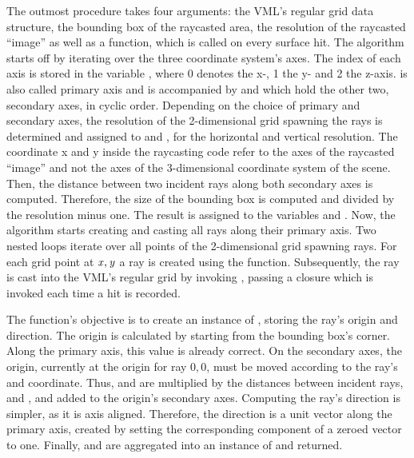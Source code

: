 %
The outmost procedure  takes four arguments: the VML's regular grid data structure, the bounding box of the raycasted area, the resolution of the raycasted \enquote{image} as well as a function, which is called on every surface hit.
The algorithm starts off by iterating over the three coordinate system's axes.
The index of each axis is stored in the variable , where 0 denotes the x-, 1 the y- and 2 the z-axis.
 is also called primary axis and is accompanied by  and  which hold the other two, secondary axes, in cyclic order.
Depending on the choice of primary and secondary axes, the resolution of the 2-dimensional grid spawning the rays is determined and assigned to  and , for the horizontal and vertical resolution.
The coordinate x and y inside the raycasting code refer to the axes of the raycasted \enquote{image} and not the axes of the 3-dimensional coordinate system of the scene.
Then, the distance between two incident rays along both secondary axes is computed.
Therefore, the size of the bounding box is computed and divided by the resolution minus one.
The result is assigned to the variables  and .
Now, the algorithm starts creating and casting all rays along their primary axis.
Two nested loops iterate over all points of the 2-dimensional grid spawning rays.
For each grid point at $\mathit{x}, \mathit{y}$ a ray is created using the  function.
Subsequently, the ray is cast into the VML's regular grid by invoking , passing a closure which is invoked each time a hit is recorded.

The  function's objective is to create an instance of , storing the ray's origin and direction.
The origin is calculated by starting from the bounding box's  corner.
Along the primary axis, this value is already correct.
On the secondary axes, the origin, currently at the origin for ray $0, 0$, must be moved according to the ray's  and  coordinate.
Thus,  and  are multiplied by the distances between incident rays,  and , and added to the origin's secondary axes.
%
Computing the ray's direction is simpler, as it is axis aligned.
Therefore, the direction is a unit vector along the primary axis, created by setting the corresponding component of a zeroed vector to one.
%
Finally,  and  are aggregated into an instance of  and returned.

